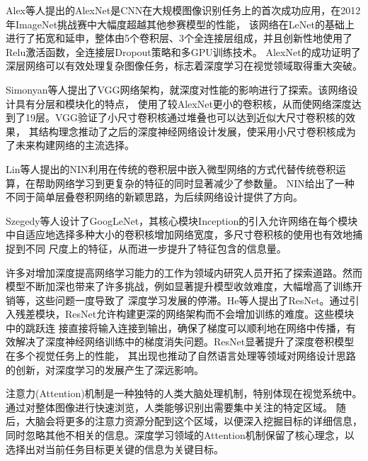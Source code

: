 Alex等人\cite{krizhevsky2012imagenet}提出的AlexNet是CNN在大规模图像识别任务上的首次成功应用，在2012年ImageNet挑战赛中大幅度超越其他参赛模型的性能，
该网络在LeNet的基础上进行了拓宽和延申，整体由5个卷积层、3个全连接层组成，并且创新性地使用了Relu激活函数，全连接层Dropout策略和多GPU训练技术。
AlexNet的成功证明了深层网络可以有效处理复杂图像任务，标志着深度学习在视觉领域取得重大突破。

Simonyan等人\cite{simonyan2014very}提出了VGG网络架构，就深度对性能的影响进行了探索。该网络设计具有分层和模块化的特点，
使用了较AlexNet更小的卷积核，从而使网络深度达到了19层。VGG验证了小尺寸卷积核通过堆叠也可以达到近似大尺寸卷积核的效果，
其结构理念推动了之后的深度神经网络设计发展，使采用小尺寸卷积核成为了未来构建网络的主流选择。

Lin等人\cite{lin2013network}提出的NIN利用在传统的卷积层中嵌入微型网络的方式代替传统卷积运算，在帮助网络学习到更复杂的特征的同时显著减少了参数量。
NIN给出了一种不同于简单层叠卷积网络的新颖思路，为后续网络设计提供了方向。

Szegedy等人\cite{szegedy2015going}设计了GoogLeNet，其核心模块Inception的引入允许网络在每个模块中自适应地选择多种大小的卷积核增加网络宽度，多尺寸卷积核的使用也有效地捕捉到不同
尺度上的特征，从而进一步提升了特征包含的信息量。

许多对增加深度提高网络学习能力的工作为领域内研究人员开拓了探索道路。然而模型不断加深也带来了许多挑战，例如显著提升模型收敛难度，大幅增高了训练开销等，这些问题一度导致了
深度学习发展的停滞。He等人\cite{he2016deep}提出了ResNet。通过引入残差模块，ResNet允许构建更深的网络架构而不会增加训练的难度。这些模块中的跳跃连
接直接将输入连接到输出，确保了梯度可以顺利地在网络中传播，有效解决了深度神经网络训练中的梯度消失问题。ResNet显著提升了深度卷积模型在多个视觉任务上的性能，
其出现也推动了自然语言处理等领域对网络设计思路的创新，对深度学习的发展产生了深远影响。

注意力(Attention)机制是一种独特的人类大脑处理机制，特别体现在视觉系统中。通过对整体图像进行快速浏览，人类能够识别出需要集中关注的特定区域。
随后，大脑会将更多的注意力资源分配到这个区域，以便深入挖掘目标的详细信息，同时忽略其他不相关的信息。深度学习领域的Attention机制保留了核心理念，以选择出对当前任务目标更关键的信息为关键目标。

